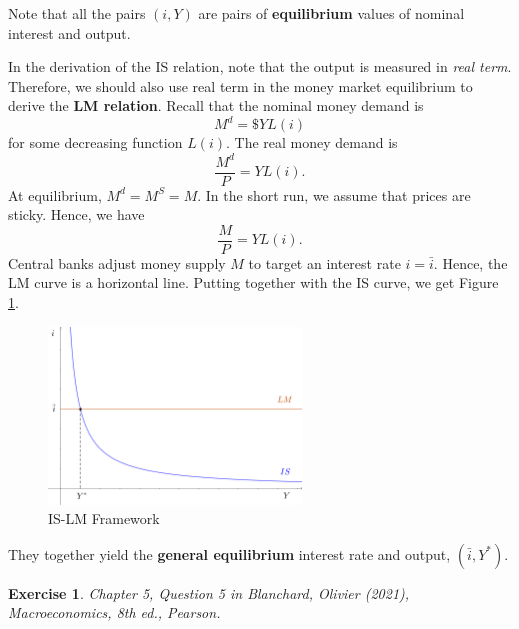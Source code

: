 \documentclass[12pt]{article}
\newtheorem{exercise}{Exercise}
\begin{document}
Note that all the pairs $(i, Y)$ are pairs of \textbf{equilibrium} values of nominal interest and output.

In the derivation of the IS relation, note that the output is measured in \textit{real term}. Therefore, we should also use real term in the money market equilibrium to derive the \textbf{LM relation}. Recall that the nominal money demand is
\[M^d = \$ Y L(i)\]
for some decreasing function $L(i)$. The real money demand is
\[\frac{M^d}{P} = Y L(i).\]
At equilibrium, $M^d = M^S = M$. In the short run, we assume that prices are sticky. Hence, we have
\[ \frac{M}{P} = Y L(i).\]
Central banks adjust money supply $M$ to target an interest rate $i = \bar{i}$. Hence, the LM curve is a horizontal line. Putting together with the IS curve, we get Figure \ref{fig:is-lm}.

\begin{figure}[htp]
    \centering
    \includegraphics[width=0.6\textwidth]{is-lm.png}
    \caption{IS-LM Framework}
    \label{fig:is-lm}
\end{figure}

They together yield the \textbf{general equilibrium} interest rate and output, $(\bar{i}, Y^*)$.

\begin{exercise}
    Chapter 5, Question 5 in Blanchard, Olivier (2021), \textit{Macroeconomics}, 8th ed., Pearson.
\end{exercise}
\end{document}
